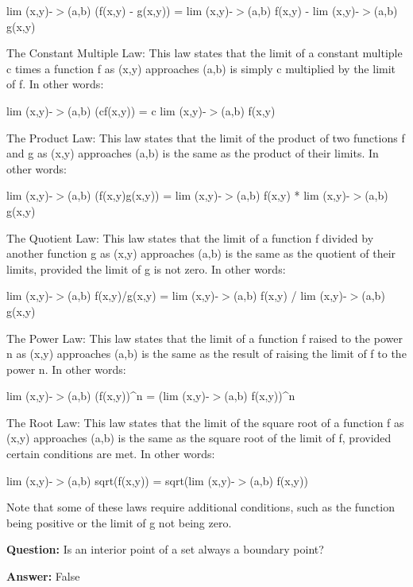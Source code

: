 \documentclass{article}
\begin{document}
lim (x,y)-\ensuremath{>}(a,b) (f(x,y) - g(x,y)) = lim (x,y)-\ensuremath{>}(a,b) f(x,y) - lim (x,y)-\ensuremath{>}(a,b) g(x,y)

The Constant Multiple Law: This law states that the limit of a constant multiple c times a function f as (x,y) approaches (a,b) is simply c multiplied by the limit of f. In other words:

lim (x,y)-\ensuremath{>}(a,b) (cf(x,y)) = c lim (x,y)-\ensuremath{>}(a,b) f(x,y)

The Product Law: This law states that the limit of the product of two functions f and g as (x,y) approaches (a,b) is the same as the product of their limits. In other words:

lim (x,y)-\ensuremath{>}(a,b) (f(x,y)g(x,y)) = lim (x,y)-\ensuremath{>}(a,b) f(x,y) * lim (x,y)-\ensuremath{>}(a,b) g(x,y)

The Quotient Law: This law states that the limit of a function f divided by another function g as (x,y) approaches (a,b) is the same as the quotient of their limits, provided the limit of g is not zero. In other words:

lim (x,y)-\ensuremath{>}(a,b) f(x,y)/g(x,y) = lim (x,y)-\ensuremath{>}(a,b) f(x,y) / lim (x,y)-\ensuremath{>}(a,b) g(x,y)

The Power Law: This law states that the limit of a function f raised to the power n as (x,y) approaches (a,b) is the same as the result of raising the limit of f to the power n. In other words:

lim (x,y)-\ensuremath{>}(a,b) (f(x,y)){\textasciicircum}n = (lim (x,y)-\ensuremath{>}(a,b) f(x,y)){\textasciicircum}n

The Root Law: This law states that the limit of the square root of a function f as (x,y) approaches (a,b) is the same as the square root of the limit of f, provided certain conditions are met. In other words:

lim (x,y)-\ensuremath{>}(a,b) sqrt(f(x,y)) = sqrt(lim (x,y)-\ensuremath{>}(a,b) f(x,y))

Note that some of these laws require additional conditions, such as the function being positive or the limit of g not being zero.
                
                \vspace{0.5cm} 
        
            
                \textbf {Question:} Is an interior point of a set always a boundary point?
                
                \textbf{Answer:} False
\end{document}
